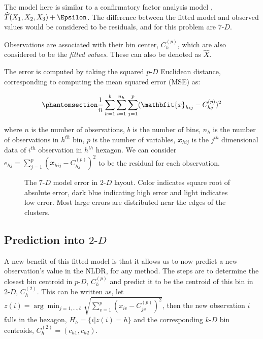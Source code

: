 \documentclass[
  12pt]{article}
\newcommand\pD{$p\text{-}D$}
\newcommand\kD{$k\text{-}D$}
\newcommand\gD{$2\text{-}D$}
\begin{document}
The model here is similar to a confirmatory factor analysis model
\citep{brown2015}, \(\widehat{T}(X_1, X_2, X_3) + \Epsilon\). The
difference between the fitted model and observed values would be
considered to be residuals, and for this problem are \(7\text{-}D\).

Observations are associated with their bin center, \(C_{h}^{(p)}\),
which are also considered to be the \emph{fitted values}. These can also
be denoted as \(\widehat{X}\).

The error is computed by taking the squared \pD{} Euclidean distance,
corresponding to computing the mean squared error (MSE) as:

\begin{equation}\phantomsection\label{eq-equation1}{\frac{1}{n}\sum_{h = 1}^{b}\sum_{i = 1}^{n_h}\sum_{j = 1}^{p} (\mathbfit{x}_{hij} - C^{(p)}_{hj})^2}\end{equation}

where \(n\) is the number of observations, \(b\) is the number of bins,
\(n_h\) is the number of observations in \(h^{th}\) bin, \(p\) is the
number of variables, \(\mathbfit{x}_{hij}\) is the \(j^{th}\)
dimensional data of \(i^{th}\) observation in \(h^{th}\) hexagon. We can
consider
\(e_{hj} = \sum_{j = 1}^{p} (\mathbfit{x}_{hij} - C^{(p)}_{hj})^2\) to
be the residual for each observation.

\begin{figure}[H]


\caption{\label{fig-p-d-error-in-2d-two-curvy}The \(7\text{-}D\) model
error in \gD{} layout. Color indicates square root of absolute error,
dark blue indicating high error and light indicates low error. Most
large errors are distributed near the edges of the clusters.}

\end{figure}%

\subsection{\texorpdfstring{Prediction into
\gD{}}{Prediction into }}\label{prediction-into}

A new benefit of this fitted model is that it allows us to now predict a
new observation's value in the NLDR, for any method. The steps are to
determine the closest bin centroid in \pD{}, \(C^{(p)}_{h}\) and predict
it to be the centroid of this bin in \gD{}, \(C^{(2)}_{h}\). This can be
written as, let
\(z(i) = \arg\min_{j = 1, \dots, b} \sqrt{\sum_{v=1}^{p}(x_{iv} - C^{(p)}_{jv})^2}\),
then the new observation \(i\) falls in the hexagon,
\(H_h = \{i| z(i) = h\}\) and the corresponding \kD{} bin centroids,
\(C_{h}^{(2)} = (c_{h1}, c_{h2})\).
\end{document}
